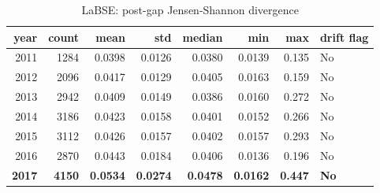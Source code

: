 \begin{table}[ht]
\centering
\caption{LaBSE: post-gap Jensen-Shannon divergence}
\label{tab:labse_jsd_yearly}
\begin{tabular}{rrrrrrrl}
\toprule
year & count & mean & std & median & min & max & drift flag \\
\midrule
2011 & 1284 & 0.0398 & 0.0126 & 0.0380 & 0.0139 & 0.135 & No \\
2012 & 2096 & 0.0417 & 0.0129 & 0.0405 & 0.0163 & 0.159 & No \\
2013 & 2942 & 0.0409 & 0.0149 & 0.0386 & 0.0160 & 0.272 & No \\
2014 & 3186 & 0.0423 & 0.0158 & 0.0401 & 0.0152 & 0.266 & No \\
2015 & 3112 & 0.0426 & 0.0157 & 0.0402 & 0.0157 & 0.293 & No \\
2016 & 2870 & 0.0443 & 0.0184 & 0.0406 & 0.0136 & 0.196 & No \\
\textbf{2017} & \textbf{4150} & \textbf{0.0534} & \textbf{0.0274} & \textbf{0.0478} & \textbf{0.0162} & \textbf{0.447} & \textbf{No} \\
\bottomrule
\end{tabular}
\end{table}

